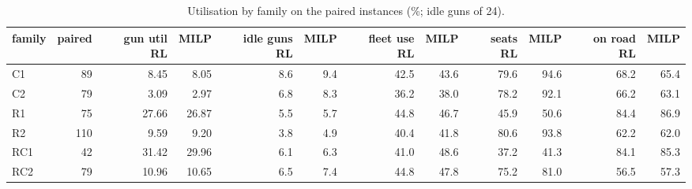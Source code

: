 \begin{table}[H]\centering
\small
\caption{Utilisation by family on the paired instances (\%; idle guns of 24).}\label{tab:utilfamily}
\begin{adjustbox}{max width=\textwidth}\begin{tabular}{lrrrrrrrrrrr}\toprule
family & paired & gun util RL & MILP & idle guns RL & MILP & fleet use RL & MILP & seats RL & MILP & on road RL & MILP \\ \midrule
C1 & 89 & 8.45 & 8.05 & 8.6 & 9.4 & 42.5 & 43.6 & 79.6 & 94.6 & 68.2 & 65.4 \\
C2 & 79 & 3.09 & 2.97 & 6.8 & 8.3 & 36.2 & 38.0 & 78.2 & 92.1 & 66.2 & 63.1 \\
R1 & 75 & 27.66 & 26.87 & 5.5 & 5.7 & 44.8 & 46.7 & 45.9 & 50.6 & 84.4 & 86.9 \\
R2 & 110 & 9.59 & 9.20 & 3.8 & 4.9 & 40.4 & 41.8 & 80.6 & 93.8 & 62.2 & 62.0 \\
RC1 & 42 & 31.42 & 29.96 & 6.1 & 6.3 & 41.0 & 48.6 & 37.2 & 41.3 & 84.1 & 85.3 \\
RC2 & 79 & 10.96 & 10.65 & 6.5 & 7.4 & 44.8 & 47.8 & 75.2 & 81.0 & 56.5 & 57.3 \\
\bottomrule\end{tabular}\end{adjustbox}\end{table}
